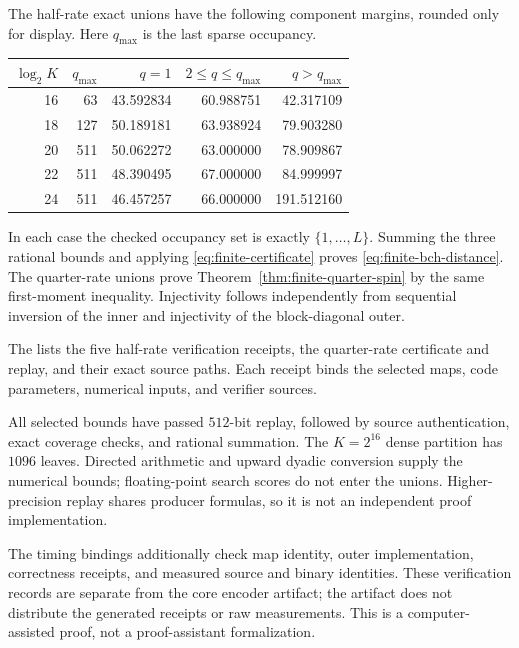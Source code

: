 The half-rate exact unions have the following component margins, rounded
only for display. Here $q_{\max}$ is the last sparse occupancy.
\begin{center}
\begin{tabular}{@{}rrrrr@{}}
\toprule
$\log_2K$ & $q_{\max}$ & $q=1$ & $2\le q\le q_{\max}$ & $q>q_{\max}$\\
\midrule
16 & 63 & 43.592834 & 60.988751 & 42.317109\\
18 & 127 & 50.189181 & 63.938924 & 79.903280\\
20 & 511 & 50.062272 & 63.000000 & 78.909867\\
22 & 511 & 48.390495 & 67.000000 & 84.999997\\
24 & 511 & 46.457257 & 66.000000 & 191.512160\\
\bottomrule
\end{tabular}
\end{center}
In each case the checked occupancy set is exactly $\{1,\ldots,L\}$.
Summing the three rational bounds and applying
\eqref{eq:finite-certificate} proves \eqref{eq:finite-bch-distance}.
The quarter-rate unions prove Theorem~\ref{thm:finite-quarter-spin}
by the same first-moment inequality.
Injectivity follows independently from sequential inversion of the inner
and injectivity of the block-diagonal outer.

The 
lists the five half-rate verification receipts, the quarter-rate certificate
and replay, and their exact source paths. Each receipt binds
the selected maps, code parameters, numerical inputs, and verifier sources.

All selected bounds have passed $512$-bit replay, followed by source
authentication, exact coverage checks, and rational summation.
The $K=2^{16}$ dense partition has $1096$ leaves.
Directed arithmetic and upward dyadic conversion supply the numerical
bounds; floating-point search scores do not enter the unions.
Higher-precision replay shares producer formulas, so it is not an
independent proof implementation.

The timing bindings additionally check map identity, outer implementation,
correctness receipts, and measured source and binary identities.
These verification records are separate from the core encoder artifact;
the artifact does not distribute the generated receipts or raw measurements.
This is a computer-assisted proof, not a proof-assistant formalization.
